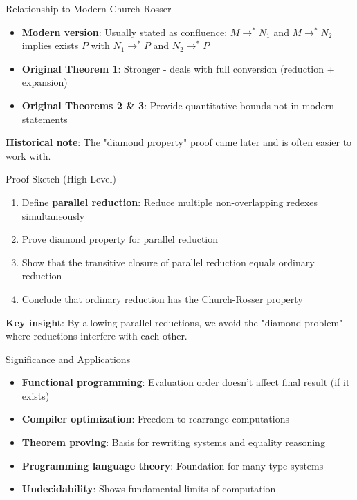 \documentclass[10pt]{beamer}
\begin{document}
\begin{frame}{Relationship to Modern Church-Rosser}
\begin{itemize}
\item \textbf{Modern version}: Usually stated as confluence: \(M \rightarrow^* N_1\) and \(M \rightarrow^* N_2\) implies exists \(P\) with \(N_1 \rightarrow^* P\) and \(N_2 \rightarrow^* P\)
\item \textbf{Original Theorem 1}: Stronger - deals with full conversion (reduction + expansion)
\item \textbf{Original Theorems 2 \& 3}: Provide quantitative bounds not in modern statements
\end{itemize}

\vspace{0.3cm}
\textbf{Historical note}: The "diamond property" proof came later and is often easier to work with.
\end{frame}

\begin{frame}{Proof Sketch (High Level)}
\begin{enumerate}
\item Define \textbf{parallel reduction}: Reduce multiple non-overlapping redexes simultaneously
\item Prove diamond property for parallel reduction
\item Show that the transitive closure of parallel reduction equals ordinary reduction
\item Conclude that ordinary reduction has the Church-Rosser property
\end{enumerate}

\vspace{0.3cm}
\textbf{Key insight}: By allowing parallel reductions, we avoid the "diamond problem" where reductions interfere with each other.
\end{frame}

\begin{frame}{Significance and Applications}
\begin{itemize}
\item \textbf{Functional programming}: Evaluation order doesn't affect final result (if it exists)
\item \textbf{Compiler optimization}: Freedom to rearrange computations
\item \textbf{Theorem proving}: Basis for rewriting systems and equality reasoning
\item \textbf{Programming language theory}: Foundation for many type systems
\item \textbf{Undecidability}: Shows fundamental limits of computation
\end{itemize}
\end{frame}
\end{document}
